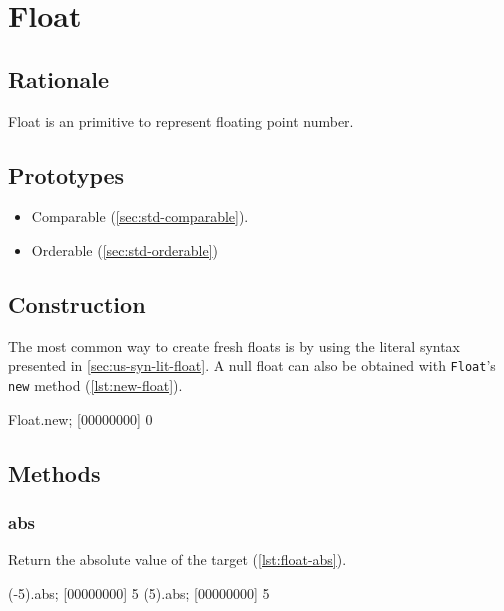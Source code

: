 \section{Float}
\subsection{Rationale}

Float is an \us primitive to represent floating point number.

\subsection{Prototypes}

\begin{itemize}
\item Comparable (\autoref{sec:std-comparable}).
\item Orderable (\autoref{sec:std-orderable})
\end{itemize}

\subsection{Construction}

The most common way to create fresh floats is by using the literal
syntax presented in \autoref{sec:us-syn-lit-float}. A null float can also be
obtained with \lstinline|Float|'s \lstinline|new| method
(\autoref{lst:new-float}).

\begin{urbiscript}[caption=Creating a new float, label=lst:new-float,
  float=\floatpos]
Float.new;
[00000000] 0
\end{urbiscript}

\subsection{Methods}


\subsubsection{abs}

Return the absolute value of the target (\autoref{lst:float-abs}).

\begin{urbiscript}[caption=Float.abs, label=lst:float-abs,
  float=\floatposh]
(-5).abs;
[00000000] 5
(5).abs;
[00000000] 5
\end{urbiscript}

